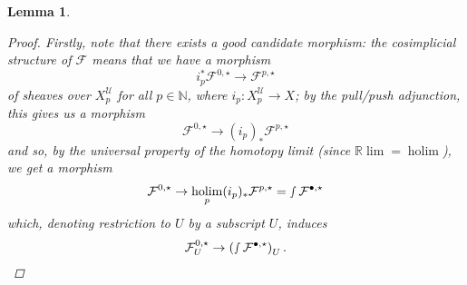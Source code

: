 \documentclass[11pt,fleqn]{article}
\theoremstyle{plain}
\newtheorem{lemma}[theorem]{Lemma}
\theoremstyle{definition}
\theoremstyle{remark}
\numberwithin{equation}{theorem}
\newcommand{\cover}{\mathcal{U}}
\newcommand{\anotherbullet}{\star}
\newcommand{\nerve}[1]{X_{#1}^\cover}
\DeclareMathOperator{\holim}{holim}
\begin{document}
\begin{lemma}
\begin{proof}
                Firstly, note that there exists a good candidate morphism: the cosimplicial structure of $\mathcal{F}$ means that we have a morphism
                \[
                    i_p^*\mathcal{F}^{0,\anotherbullet}
                    \to
                    \mathcal{F}^{p,\anotherbullet}
                \]
                of sheaves over $\nerve{p}$ for all $p\in\mathbb{N}$, where $i_p\colon\nerve{p}\to X$;
                by the pull/push adjunction, this gives us a morphism
                \[
                    \mathcal{F}^{0,\anotherbullet}
                    \to
                    (i_p)_*\mathcal{F}^{p,\anotherbullet}
                \]
                and so, by the universal property of the homotopy limit (since $\mathbb{R}\lim=\holim$), we get a morphism
                \[
                    \mathcal{F}^{0,\anotherbullet}
                    \to
                    \holim_p(i_p)_*\mathcal{F}^{p,\anotherbullet}
                    =
                    \smallint \mathcal{F}^{\bullet,\anotherbullet}
                \]
                which, denoting restriction to $U$ by a subscript $U$, induces
                \begin{equation}\label{equation:candidate-map-to-be-q-iso}
                    \mathcal{F}_U^{0,\anotherbullet}
                    \to
                    \left(
                        \smallint \mathcal{F}^{\bullet,\anotherbullet}
                    \right)_U.
                \end{equation}


\end{proof}
\end{lemma}
\end{document}

